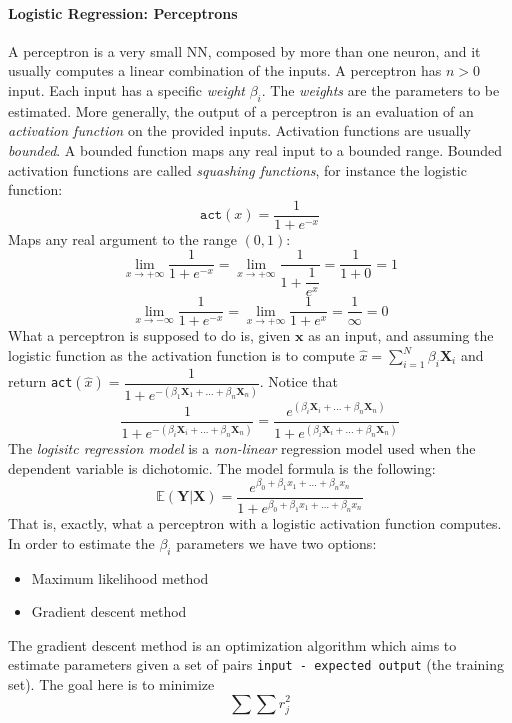 \documentclass[10pt,a4paper]{article}
\begin{document}
	\paragraph{Logistic Regression: Perceptrons}
	A perceptron is a very small NN, composed by more than one neuron, and it usually computes a linear combination of the inputs.
	A perceptron has $n>0$ input. Each input has a specific \emph{weight} $\beta_i$. The \emph{weights} are the parameters to be estimated. 
	More generally, the output of a perceptron is an evaluation of an \emph{activation function} on the provided inputs. Activation functions are usually \emph{bounded}. A bounded function maps any real input to a bounded range. Bounded activation functions are called \emph{squashing functions}, for instance the logistic function:
	$$
	\texttt{act}(x) = \dfrac{1}{1+e^{-x}}
	$$
	Maps any real argument to the range $(0,1)$:
	$$
	\lim_{x\rightarrow +\infty} \dfrac{1}{1+e^{-x}} = 	\lim_{x\rightarrow +\infty} \dfrac{1}{1+\dfrac{1}{e^x}} = \dfrac{1}{1+0} = 1
	$$
	$$
	\lim_{x\rightarrow -\infty} \dfrac{1}{1+e^{-x}} = 	\lim_{x\rightarrow +\infty} \dfrac{1}{1+{e^x}} = \dfrac{1}{\infty} = 0
	$$
	What a perceptron is supposed to do is, given $\textbf{x}$ as an input, and assuming the logistic function as the activation function is to
	 compute $\hat x = \sum_{i=1}^N \beta_i \textbf{X}_i$ and 
		return \texttt{act}$(\hat x) = \dfrac{1}{1+e^{-(\beta_1\textbf{X}_1+ \dots + \beta_n\textbf{X}_n)}}$.
	Notice that 
	$$
	\dfrac{1}{1+e^{-(\beta_i\textbf{X}_i+ \dots + \beta_n\textbf{X}_n)}} =\dfrac{e^{(\beta_i\textbf{X}_i+ \dots + \beta_n\textbf{X}_n)}}{1+e^{(\beta_i\textbf{X}_i+ \dots + \beta_n\textbf{X}_n)}}
	$$
	The \emph{logisitc regression model} is a \emph{non-linear} regression model used when the dependent variable is dichotomic. The model formula is the following:
	$$
	\mathbb{E}(\textbf{Y}|\textbf{X}) = \dfrac{e^{\beta_0 + \beta_1x_1+\dots+\beta_n x_n}}{1 +e^{\beta_0 + \beta_1x_1+\dots+\beta_n x_n} }
	$$
	That is, exactly, what a perceptron with a logistic activation function computes. In order to estimate the $\beta_i$ parameters we have two options:
	\begin{itemize}
		\item Maximum likelihood \color{black} method
		\item Gradient descent \color{black} method
	\end{itemize}
	The gradient descent method is an optimization algorithm which aims to estimate parameters given a set of pairs \texttt{input - expected output} (the training set). 
	The goal here is to minimize 	$$
\sum \sum r_j^2
$$
\end{document}
